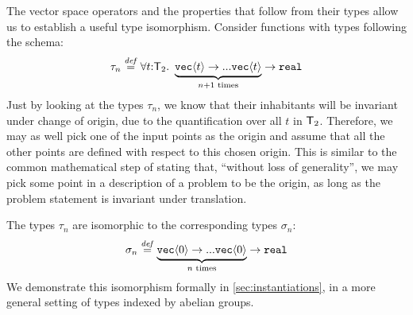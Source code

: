 \begin{example}\label{ex:type-iso}
  The vector space operators and the properties that follow from their
  types allow us to establish a useful type isomorphism. Consider
  functions with types following the schema:
  \begin{displaymath}
    \tau_{n} \stackrel{\mathit{def}}= \forall t\mathord:\mathsf{T}_2.\ \underbrace{\texttt{vec}\langle t \rangle \to ... \texttt{vec}\langle t \rangle}_{n+1\textrm{ times}} \to \texttt{real}
  \end{displaymath}
  Just by looking at the types $\tau_{n}$, we know that their
  inhabitants will be invariant under change of origin, due to the
  quantification over all $t$ in $\mathsf{T}_2$. Therefore, we may as well pick
  one of the input points as the origin and assume that all the other
  points are defined with respect to this chosen origin. This is
  similar to the common mathematical step of stating that, ``without
  loss of generality'', we may pick some point in a description of a
  problem to be the origin, as long as the problem statement is
  invariant under translation.

  The types $\tau_{n}$ are isomorphic to the corresponding types
  $\sigma_{n}$:
  \begin{displaymath}
    \sigma_{n} \stackrel{\mathit{def}}= \underbrace{\texttt{vec}\langle 0 \rangle \to ... \texttt{vec}\langle 0 \rangle}_{n\textrm{ times}} \to \texttt{real}
  \end{displaymath}
  We demonstrate this isomorphism formally in
  \autoref{sec:instantiations}, in a more general setting of types
  indexed by abelian groups.

\end{example}


